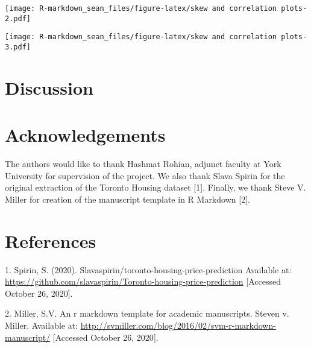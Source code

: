 \documentclass[11pt,]{article}
\newenvironment{Shaded}{\begin{snugshade}}{\end{snugshade}}
\newcommand{\CommentTok}[1]{\textcolor[rgb]{0.56,0.35,0.01}{\textit{#1}}}
\newcommand{\DataTypeTok}[1]{\textcolor[rgb]{0.13,0.29,0.53}{#1}}
\newcommand{\DecValTok}[1]{\textcolor[rgb]{0.00,0.00,0.81}{#1}}
\newcommand{\KeywordTok}[1]{\textcolor[rgb]{0.13,0.29,0.53}{\textbf{#1}}}
\newcommand{\NormalTok}[1]{#1}
\newcommand{\OperatorTok}[1]{\textcolor[rgb]{0.81,0.36,0.00}{\textbf{#1}}}
\newcommand{\StringTok}[1]{\textcolor[rgb]{0.31,0.60,0.02}{#1}}
\begin{document}
\texttt{[image: R-markdown\_sean\_files/figure-latex/skew and correlation plots-2.pdf]}

\begin{Shaded}
\end{Shaded}

\texttt{[image: R-markdown\_sean\_files/figure-latex/skew and correlation plots-3.pdf]}

\hypertarget{discussion}{%
\section{Discussion}\label{discussion}}

\hypertarget{acknowledgements}{%
\section{Acknowledgements}\label{acknowledgements}}

The authors would like to thank Hashmat Rohian, adjunct faculty at York
University for supervision of the project. We also thank Slava Spirin
for the original extraction of the Toronto Housing dataset {[}1{]}.
Finally, we thank Steve V. Miller for creation of the manuscript
template in R Markdown {[}2{]}.

\hypertarget{references}{%
\section{References}\label{references}}

\noindent

\hypertarget{refs}{}
\leavevmode\hypertarget{ref-spirin_slavaspirintoronto-housing-price-prediction_2020}{}%
1. Spirin, S. (2020). Slavaspirin/toronto-housing-price-prediction
Available at:
\url{https://github.com/slavaspirin/Toronto-housing-price-prediction}
{[}Accessed October 26, 2020{]}.

\leavevmode\hypertarget{ref-miller_r_nodate}{}%
2. Miller, S.V. An r markdown template for academic manuscripts. Steven
v. Miller. Available at:
\url{http://svmiller.com/blog/2016/02/svm-r-markdown-manuscript/}
{[}Accessed October 26, 2020{]}.





\newpage
\singlespacing 
\end{document}
